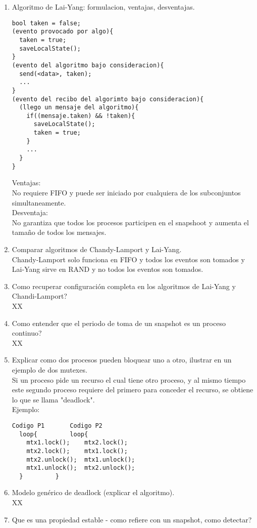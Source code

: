 \documentclass[letterpaper, 12pt]{article}
\begin{document}
\begin{enumerate}
		\item Algoritmo de Lai-Yang: formulacion, ventajas, desventajas.
			\begin{lstlisting}				
bool taken = false;
(evento provocado por algo){
  taken = true;
  saveLocalState();
}
(evento del algoritmo bajo consideracion){
  send(<data>, taken);
  ...
}
(evento del recibo del algorimto bajo consideracion){
  (llego un mensaje del algoritmo){
    if((mensaje.taken) && !taken){
      saveLocalState();
      taken = true;    
    }  
    ...
  }
}
			\end{lstlisting}

Ventajas:
\\ No requiere FIFO y puede ser iniciado por cualquiera de los subconjuntos simultaneamente.
\\Desventaja:
\\No garantiza que todos los procesos participen en el snapshoot y aumenta el tamaño de todos los mensajes.
		\item Comparar algoritmos de Chandy-Lamport y Lai-Yang.
			\\ Chandy-Lamport solo funciona en FIFO y todos los eventos son tomados y Lai-Yang sirve en RAND y no todos los eventos son tomados.  
		\item Como recuperar configuración completa en los algoritmos de Lai-Yang y Chandi-Lamport?
		\\XX
		\item Como entender que el periodo de toma de un snapshot es un proceso continuo?
		\\XX
		\item Explicar como dos procesos pueden bloquear uno a otro, ilustrar en un ejemplo de dos mutexes.
			\\Si un proceso pide un recurso el cual tiene otro proceso, y al mismo tiempo este segundo proceso requiere del primero para conceder el recurso, se obtiene lo que se llama "deadlock".
			\\Ejemplo: 
			\begin{lstlisting}			
Codigo P1		Codigo P2
  loop{			loop{
    mtx1.lock();	mtx2.lock(); 
    mtx2.lock();	mtx1.lock();     
    mtx2.unlock();	mtx1.unlock(); 
    mtx1.unlock();	mtx2.unlock(); 
  }			}
			\end{lstlisting}
		\item Modelo genérico de deadlock (explicar el algoritmo).
		\\XX
		\item Que es una propiedad estable - como refiere con un snapshot, como detectar?

\end{enumerate}
\end{document}
